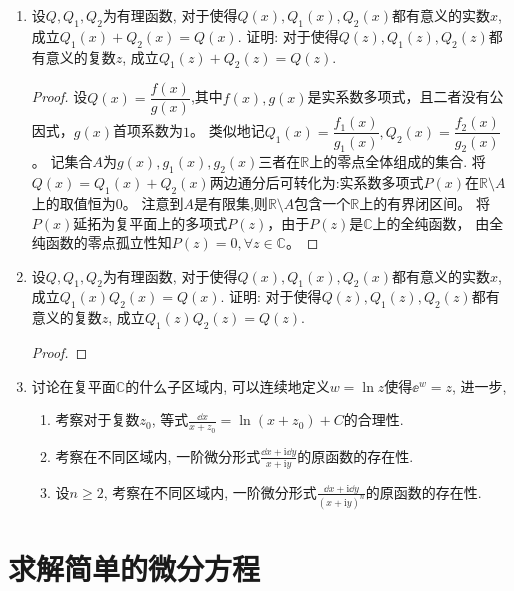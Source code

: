 \begin{4b}
\begin{enumerate}
\item 设\(Q,Q_1,Q_2\)为有理函数, 
对于使得\(Q(x),Q_1(x),Q_2(x)\)都有意义的实数\(x\), 成立\(Q_1(x)+Q_2(x)=Q(x)\). 
证明: 对于使得\(Q(z),Q_1(z),Q_2(z)\)都有意义的复数\(z\), 成立\(Q_1(z)+Q_2(z)=Q(z)\).
\begin{proof}
设$Q(x)=\dfrac{f(x)}{g(x)}$,其中$f(x),g(x)$是实系数多项式，且二者没有公因式，$g(x)$首项系数为$1$。
类似地记$Q_{1}(x)=\dfrac{f_{1}(x)}{g_{1}(x)},Q_{2}(x)=\dfrac{f_{2}(x)}{g_{2}(x)}$。
记集合$A$为$g(x),g_{1}(x),g_{2}(x)$三者在$\mathbb{R}$上的零点全体组成的集合.
将$Q(x)=Q_{1}(x)+Q_{2}(x)$两边通分后可转化为:实系数多项式$P(x)$在$\mathbb{R}\setminus A$上的取值恒为$0$。
注意到$A$是有限集,则$\mathbb{R}\setminus A$包含一个$\mathbb{R}$上的有界闭区间。
将$P(x)$延拓为复平面上的多项式$P(z)$，由于$P(z)$是$\mathbb{C}$上的全纯函数，
由全纯函数的零点孤立性知$P(z)=0,\forall z\in \mathbb{C}$。
\end{proof}
\item 设\(Q,Q_1,Q_2\)为有理函数, 
对于使得\(Q(x),Q_1(x),Q_2(x)\)都有意义的实数\(x\), 成立\(Q_1(x)Q_2(x)=Q(x)\). 
证明: 对于使得\(Q(z),Q_1(z),Q_2(z)\)都有意义的复数\(z\), 成立\(Q_1(z)Q_2(z)=Q(z)\).
\begin{proof}

\end{proof}
\item 讨论在复平面\(\mathbb{C}\)的什么子区域内, 可以连续地定义\(w=\ln z\)使得\(\ee^w=z\), 进一步,
\begin{enumerate}[label=(\arabic*)]
\item 考察对于复数\(z_0\), 等式\(\frac{\dd x}{x+z_0}=\ln (x+z_0)+C\)的合理性.
\item 考察在不同区域内, 一阶微分形式\(\frac{\dd x+\mathrm{i}\dd y}{x+\mathrm{i}y}\)的原函数的存在性.
\item 设\(n\geqslant 2\), 考察在不同区域内, 一阶微分形式\(\frac{\dd x+\mathrm{i}\dd y}{(x+\mathrm{i}y)^n}\)的原函数的存在性.
\end{enumerate}
\end{enumerate}
\end{4b}
\section{求解简单的微分方程}
